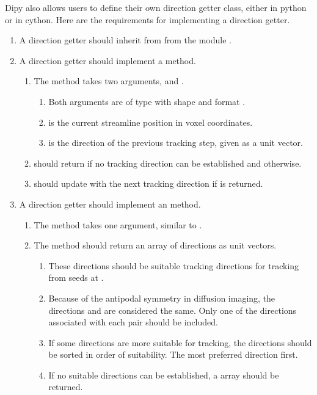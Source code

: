 Dipy also allows users to define their own direction getter class, either in python or in cython. Here are the requirements for implementing a direction getter.
\begin{enumerate}
\item A direction getter should inherit from  from the module .
\item A direction getter should implement a  method.
\begin{enumerate}
\item The  method takes two arguments,  and .
\begin{enumerate}
\item Both arguments are of type  with shape  and format .
\item {} is the current streamline position in voxel coordinates.
\item {} is the direction of the previous tracking step, given as a unit vector.
\end{enumerate}
\item {} should return  if no tracking direction can be established and  otherwise.
\item {} should update  with the next tracking direction if  is returned.
\end{enumerate}
\item A direction getter should implement an  method.
\begin{enumerate}
\item The  method takes one argument,  similar to .
\item The  method should return an  array of directions as unit vectors.
\begin{enumerate}
\item These directions should be suitable tracking directions for tracking from seeds at .
\item Because of the antipodal symmetry in diffusion imaging, the directions  and  are considered the same. Only one of the directions associated with each pair should be included.
\item If some directions are more suitable for tracking, the directions should be sorted in order of suitability. The most preferred direction first.  
\item If no suitable directions can be established, a  array should be returned.
\end{enumerate}
\end{enumerate}
\end{enumerate}

